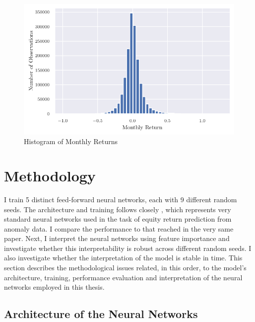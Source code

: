	
	\begin{center}
		\begin{figure}
			\includegraphics{Figures/hist_returns.pdf}
			\caption{Histogram of Monthly Returns}
			\label{fig:hist_returns}
		\end{figure}
	\end{center}


\section{Methodology}

	I train 5 distinct feed-forward neural networks, each with 9 different random seeds. The architecture and training follows closely \cite{gu2020empirical}, which represents very standard neural networks used in the task of equity return prediction from anomaly data. I compare the performance to that reached in the very same paper. Next, I interpret the neural networks using feature importance and investigate whether this interpretability is robust across different random seeds. I also investigate whether the interpretation of the model is stable in time. This  section describes the methodological issues related, in this order, to the model's architecture, training, performance evaluation and interpretation of the neural networks employed in this thesis.
	
	\subsection{Architecture of the Neural Networks}
	
